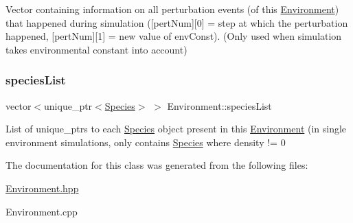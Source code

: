 Vector containing information on all perturbation events (of this \hyperlink{classEnvironment}{Environment}) that happened during simulation (\mbox{[}pert\+Num\mbox{]}\mbox{[}0\mbox{]} = step at which the perturbation happened, \mbox{[}pert\+Num\mbox{]}\mbox{[}1\mbox{]} = new value of env\+Const). (Only used when simulation takes environmental constant into account) \hypertarget{classEnvironment_ac27d43c32a9db69a4115d09b3145831a}{}\label{classEnvironment_ac27d43c32a9db69a4115d09b3145831a} 
\subsubsection{\texorpdfstring{species\+List}{speciesList}}
{\footnotesize\ttfamily vector$<$unique\+\_\+ptr$<$\hyperlink{classSpecies}{Species}$>$ $>$ Environment\+::species\+List\hspace{0.3cm}{\ttfamily [protected]}}

List of unique\+\_\+ptrs to each \hyperlink{classSpecies}{Species} object present in this \hyperlink{classEnvironment}{Environment} (in single environment simulations, only contains \hyperlink{classSpecies}{Species} where {\ttfamily density != 0} 

The documentation for this class was generated from the following files\+:\begin{DoxyCompactItemize}
\item 
\hyperlink{Environment_8hpp}{Environment.\+hpp}\item 
Environment.\+cpp\end{DoxyCompactItemize}
